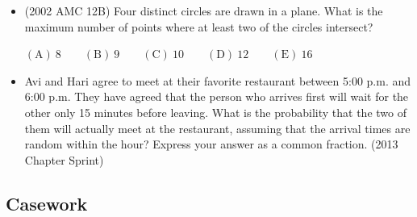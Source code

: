 \documentclass{article}
\begin{document}
\begin{itemize}
\item (2002 AMC 12B) Four distinct circles are drawn in a plane. What is the maximum number of points where at least two of the circles intersect? 

$\mathrm{(A)}\ 8
\qquad\mathrm{(B)}\ 9
\qquad\mathrm{(C)}\ 10
\qquad\mathrm{(D)}\ 12
\qquad\mathrm{(E)}\ 16$

\item Avi and Hari agree to meet at their favorite restaurant between 5:00 p.m. and 6:00 p.m. They have agreed that the person who arrives first will wait for the other only 15 minutes before leaving. What is the probability that the two of them will actually meet at the restaurant, assuming that the arrival times are random within the hour? Express your answer as a common fraction. (2013 Chapter Sprint)

\end{itemize}


\subsection{Casework}
\end{document}
